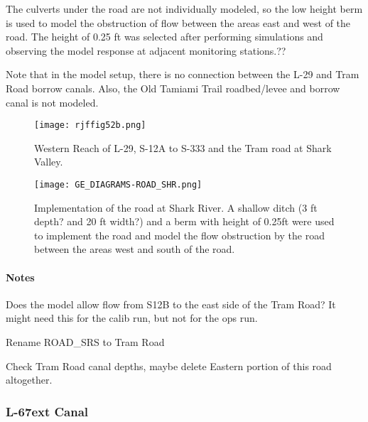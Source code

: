 The culverts under the road are not individually modeled, so the low height berm is used to model the obstruction of flow between the areas east and west of the road. The height of 0.25 ft was selected after performing simulations and observing the model response at adjacent monitoring stations.??

Note that in the model setup, there is no connection between the L-29 and Tram Road borrow canals. Also, the Old Tamiami Trail roadbed/levee and borrow canal is not modeled.

\begin{figure}[!h]
  \begin{center}
  \texttt{[image: rjffig52b.png]}
  \caption{Western Reach of L-29, S-12A to S-333 and the Tram road at Shark Valley.}
  \label{fig:rjffig52b}
  \end{center}
\end{figure}


\begin{figure}[!h]
  \begin{center}
  \texttt{[image: GE\_DIAGRAMS-ROAD\_SHR.png]}
  \caption[Implementation of the road at Shark River.]{Implementation of the road at Shark River. A shallow ditch (3 ft depth? and 20 ft width?) and a berm with height of 0.25ft were used to implement the road and model the flow obstruction by the road between the areas west and south of the road.}
  \label{fig:gitfig10}
  \end{center}
\end{figure}


\begin{notes}
\paragraph{Notes}
\begin{packed_items}
\item Does the model allow flow from S12B to the east side of the Tram Road? It might need this for the calib run, but not for the ops run.
\item Rename ROAD\_SRS to Tram Road
\item Check Tram Road canal depths, maybe delete Eastern portion of this road altogether.
\end{packed_items}
\end{notes}


\clearpage

\subsubsection{L-67ext Canal}
